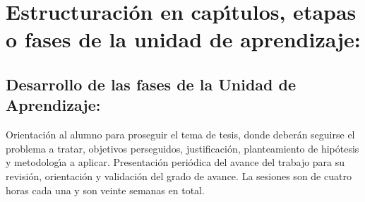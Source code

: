\documentclass[10 pt]{article}
\begin{document}
\newpage
\section{Estructuraci\'{o}n en cap\'{\i}tulos, etapas o fases de la unidad de
  aprendizaje:}
\subsection{Desarrollo de las fases de la Unidad de Aprendizaje:}

Orientaci\'{o}n al alumno para proseguir el tema de tesis, donde deber\'{a}n
seguirse el problema a tratar, objetivos perseguidos, justificaci\'{o}n,
planteamiento de hip\'{o}tesis y metodolog\'{\i}a a aplicar.  Presentaci\'{o}n
peri\'{o}dica del avance del trabajo para su revisi\'{o}n, orientaci\'{o}n y
validaci\'{o}n del grado de avance. La sesiones son de cuatro horas cada
una y son veinte semanas en total.
\end{document}
